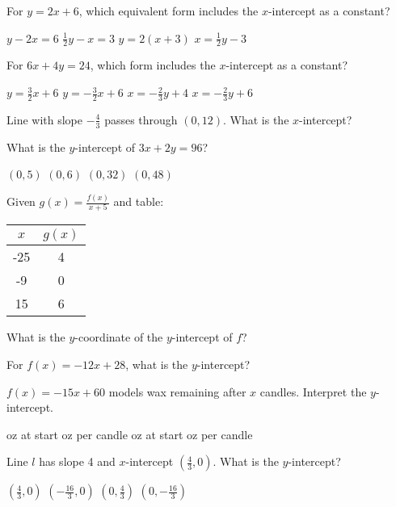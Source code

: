 \documentclass[12pt]{exam}
\begin{document}
\begin{questions}
\question For $y = 2x + 6$, which equivalent form includes the $x$-intercept as a constant?
\begin{choices}
\choice $y - 2x = 6$
\choice $\frac{1}{2}y - x = 3$
\choice $y = 2(x + 3)$
\choice $x = \frac{1}{2}y - 3$
\end{choices}

\question For $6x + 4y = 24$, which form includes the $x$-intercept as a constant?
\begin{choices}
\choice $y = \frac{3}{2}x + 6$
\choice $y = -\frac{3}{2}x + 6$
\choice $x = -\frac{2}{3}y + 4$
\choice $x = -\frac{2}{3}y + 6$
\end{choices}

\question Line with slope $-\frac{4}{3}$ passes through $(0,12)$. What is the $x$-intercept?
\begin{choices}
\end{choices}

\question What is the $y$-intercept of $3x + 2y = 96$?
\begin{choices}
\choice $(0,5)$
\choice $(0,6)$
\choice $(0,32)$
\choice $(0,48)$
\end{choices}

\question Given $g(x) = \frac{f(x)}{x + 5}$ and table:
\begin{center}
\begin{tabular}{|c|c|}
\hline
$x$ & $g(x)$ \\
\hline
-25 & 4 \\
-9 & 0 \\
15 & 6 \\
\hline
\end{tabular}
\end{center}
What is the $y$-coordinate of the $y$-intercept of $f$?

\question For $f(x) = -12x + 28$, what is the $y$-intercept?

\question $f(x) = -15x + 60$ models wax remaining after $x$ candles. Interpret the $y$-intercept.
\begin{choices}
 oz at start
 oz per candle
 oz at start
 oz per candle
\end{choices}

\question Line $l$ has slope 4 and $x$-intercept $(\frac{4}{3}, 0)$. What is the $y$-intercept?
\begin{choices}
\choice $(\frac{4}{3}, 0)$
\choice $(-\frac{16}{3}, 0)$
\choice $(0, \frac{4}{3})$
\choice $(0, -\frac{16}{3})$
\end{choices}


\end{questions}
\end{document}
